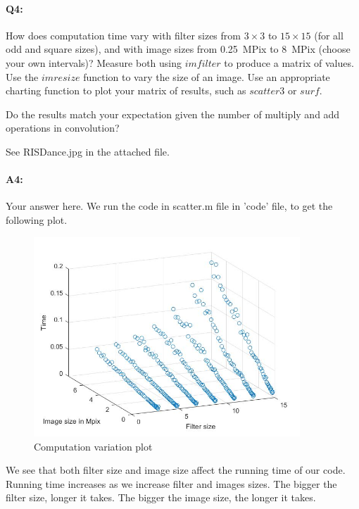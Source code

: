 	
	
	\pagebreak
	\paragraph{Q4:} How does computation time vary with filter sizes from $3\times3$ to $15\times15$ (for all odd and square sizes), and with image sizes from 0.25~MPix to 8~MPix (choose your own intervals)? Measure both using \href{https://www.mathworks.com/help/images/ref/imfilter.html}{$imfilter$} to produce a matrix of values. Use the \href{https://www.mathworks.com/help/images/ref/imresize.html}{$imresize$} function to vary the size of an image. Use an appropriate charting function to plot your matrix of results, such as \href{https://www.mathworks.com/help/matlab/ref/scatter3.html}{$scatter3$} or \href{https://www.mathworks.com/help/matlab/ref/surf.html}{$surf$}.
	
	Do the results match your expectation given the number of multiply and add operations in convolution?
	
	See RISDance.jpg in the attached file.
	
	\paragraph{A4:} Your answer here.
	 We run the code in scatter.m file in 'code' file, to get the following plot.
	 \begin{figure}[htp]
    \centering
    \includegraphics[width=10cm]{questions/scatter.jpg}
    \caption{Computation variation plot}
    \label{fig:einstein}
    \end{figure}
	
	We see that both filter size and image size affect the running time of our code. Running time increases as we increase filter and images sizes. The bigger the filter size, longer it takes. The bigger the image size, the longer it  takes. 
	
	
	
	
	
	
